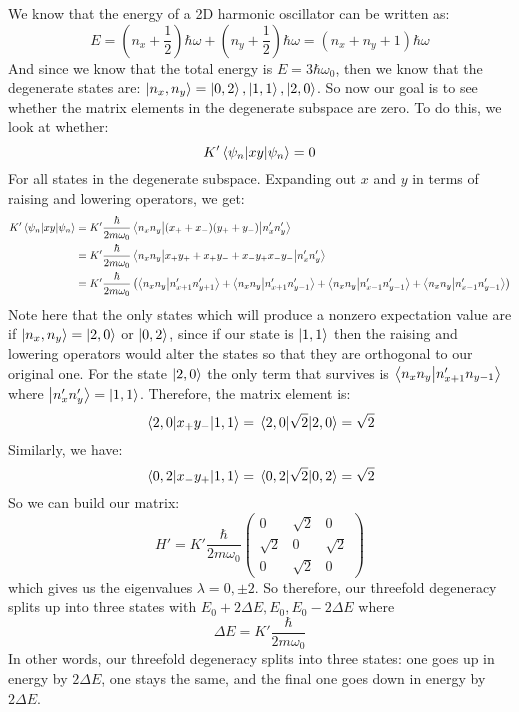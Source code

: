 \documentclass[10pt]{article}
\begin{document}
	\begin{solution}
		We know that the energy of a 2D harmonic oscillator can be written as:
		\[ E = \left( n_x + \frac{1}{2} \right) \hbar \omega + \left( n_y + \frac{1}{2} \right) \hbar \omega 
		= \left( n_x + n_y + 1 \right) \hbar \omega\]
		And since we know that the total energy is $E = 3\hbar \omega_0$, then we know that the degenerate
		states are: $\ket{n_x, n_y} = \ket{0, 2}, \ket{1, 1}, \ket{2, 0}$. So now our goal is to see whether
		the matrix elements in the degenerate subspace are zero. To do this, we look at whether:
		\[ K' \mel{\psi_n}{xy}{\psi_n} = 0 \]
		For all states in the degenerate subspace. Expanding out $x$ and $y$ in terms of raising and lowering 
		operators, we get: 
		\begin{align*}
				K'\mel{\psi_n}{xy}{\psi_n} &= K'\frac{\hbar}{2m\omega_0} \mel{n_xn_y}{(x_+ + x_-)(y_++y_-)}
				{n_x'n_y'}\\
					 &= K' \frac{\hbar}{2m\omega_0}\mel{n_xn_y}{x_+y_+ + x_+y_- + x_-y_+ 
										   x_-y_-}{n_x'n_y'}\\
					 &= K' \frac{\hbar}{2m\omega_0} \left(\braket{n_xn_y}{n_{x+1}'n_{y+1}'}	
							 + \braket{n_xn_y}{n_{x+1}'n_{y-1}'} + \braket{n_xn_y}{n_{x-1} ' n_{y-1}'} 
							 + \braket{n_xn_y}{n_{x-1}'n_{y-1}'}\right)
		\end{align*}	
		Note here that the only states which will produce a nonzero expectation value are if $\ket{n_x, n_y} 
		= \ket{2, 0}$ or $\ket{0, 2}$, since if our state is $\ket{1, 1}$ then the raising and lowering 
		operators would alter the states so that they are orthogonal to our original one. For the state 
		$\ket{2, 0}$ the only term that survives is $\braket{n_xn_y}{n_{x+1}'n_{y-1}}$ where $\ket{n_x'n_y'} =
		\ket{1, 1}$. Therefore, the matrix element is: 
		\[ \mel{2, 0}{x_+ y_-}{1, 1} = \mel{2, 0}{\sqrt{2}}{2, 0} = \sqrt{2} \]  
		Similarly, we have: 
		\[ \mel{0, 2}{x_- y_+}{1, 1} = \mel{0, 2}{\sqrt{2}}{0, 2} = \sqrt{2}\]
		So we can build our matrix:
		\[ H' = K' \frac{\hbar}{2m\omega_0}
				\begin{pmatrix} 0 & \sqrt{2} & 0\\ \sqrt{2} & 0 & \sqrt{2} \\ 0 & \sqrt{2} &0  \end{pmatrix} \]
		which gives us the eigenvalues $\lambda = 0, \pm 2$. So therefore, our threefold degeneracy splits up
		into three states with $E_0 + 2\Delta E, E_0, E_0 - 2\Delta E$ where 
		\[ \Delta E = K'\frac{\hbar}{2m\omega_0}\]
		In other words, our threefold degeneracy splits into three states: one goes up in energy by $2\Delta E$,
		one stays the same, and the final one goes down in energy by $2\Delta E$.
	\end{solution}
\end{document}
